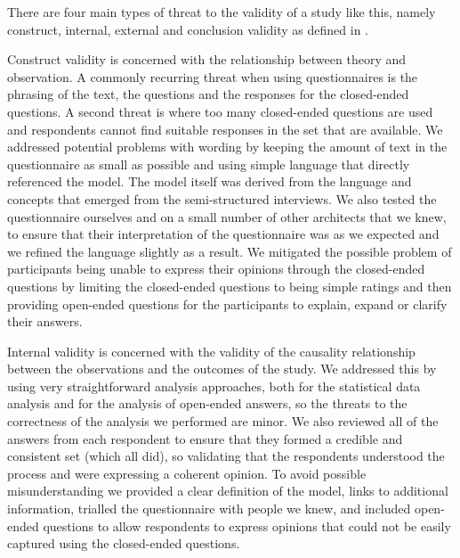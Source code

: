 There are four main types of threat to the validity of a study like this, namely construct, internal, 
external and conclusion validity as defined in \cite{matt1994-threatstovalidity}. 

Construct validity is concerned with the relationship between theory and observation.  A commonly recurring threat when using questionnaires is the phrasing of the text, the questions and the responses for the closed-ended questions.  A second threat is where too many closed-ended questions are used and respondents cannot find suitable responses in the set that are available.  We addressed potential problems with wording by keeping the amount of text in the questionnaire as small as possible and using simple language that directly referenced the model.  The model itself was derived from the language and concepts that emerged from the semi-structured interviews.  We also tested the questionnaire ourselves and on a small number of other architects that we knew, to ensure that their interpretation of the questionnaire was as we expected and we refined the language slightly as a result.  We mitigated the possible problem of participants being unable to express their opinions through the closed-ended questions by limiting the closed-ended questions to being simple ratings and then providing open-ended questions for the participants to explain, expand or clarify their answers.

Internal validity is concerned with the validity of the causality relationship between the observations and the outcomes of the study.  We addressed this by using very straightforward analysis approaches, both for the statistical data analysis and for the analysis of open-ended answers, so the threats to the correctness of the analysis we performed are minor.  We also reviewed all of the answers from each respondent to ensure that they formed a credible and consistent set (which all did), so validating that the respondents understood the process and were expressing a coherent opinion.  To avoid possible misunderstanding we provided a clear definition of the model, links to additional information, trialled the questionnaire with people we knew, and included open-ended questions to allow respondents to express opinions that could not be easily captured using the closed-ended questions.

